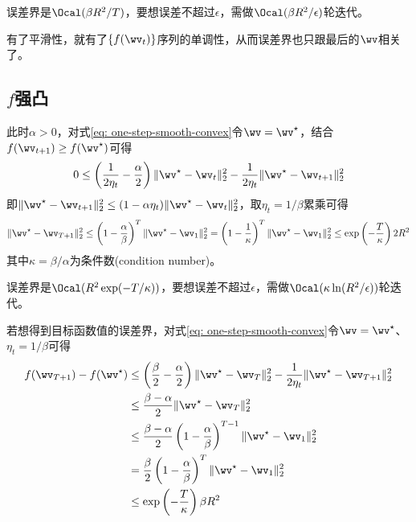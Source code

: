 \documentclass{ctexart}
\begin{document}
\begin{remark}
    误差界是$\Ocal(\beta R^2/T)$，要想误差不超过$\epsilon$，需做$\Ocal(\beta R^2/\epsilon)$轮迭代。
\end{remark}

\begin{remark}
    有了平滑性，就有了$\{ f(\wv_t) \}$序列的单调性，从而误差界也只跟最后的$\wv$相关了。
\end{remark}

\subsection{$f$强凸}

此时$\alpha > 0$，对式\eqref{eq: one-step-smooth-convex}令$\wv = \wv^\star$，结合$f(\wv_{t+1}) \ge f(\wv^\star)$可得
\begin{align*}
    0 \le \left( \frac{1}{2\eta_t} - \frac{\alpha}{2} \right) \| \wv^\star - \wv_t \|_2^2 - \frac{1}{2\eta_t} \| \wv^\star - \wv_{t+1} \|_2^2
\end{align*}
即$\| \wv^\star - \wv_{t+1} \|_2^2 \le (1 - \alpha \eta_t) \| \wv^\star - \wv_t \|_2^2$，取$\eta_t = 1/ \beta$累乘可得
\begin{align*}
    \| \wv^\star - \wv_{T+1} \|_2^2 \le \left(1 - \frac{\alpha}{\beta} \right)^T \| \wv^\star - \wv_1 \|_2^2 = \left( 1 - \frac{1}{\kappa} \right)^T \| \wv^\star - \wv_1 \|_2^2 \le \exp \left( -\frac{T}{\kappa} \right) 2 R^2
\end{align*}
其中$\kappa = \beta/\alpha$为条件数(condition number)。

\begin{remark}
    误差界是$\Ocal(R^2 \exp(-T/\kappa))$，要想误差不超过$\epsilon$，需做$\Ocal(\kappa \ln (R^2/\epsilon))$轮迭代。
\end{remark}

若想得到目标函数值的误差界，对式\eqref{eq: one-step-smooth-convex}令$\wv = \wv^\star$、$\eta_t = 1 / \beta$可得
\begin{align*}
    f(\wv_{T+1}) - f(\wv^\star)
     & \le \left( \frac{\beta}{2} - \frac{\alpha}{2} \right) \| \wv^\star - \wv_T \|_2^2 - \frac{1}{2\eta_t} \| \wv^\star - \wv_{T+1} \|_2^2 \\
     & \le \frac{\beta - \alpha}{2} \| \wv^\star - \wv_T \|_2^2                                                                              \\
     & \le \frac{\beta - \alpha}{2} \left( 1 - \frac{\alpha}{\beta} \right)^{T-1} \| \wv^\star - \wv_1 \|_2^2                                \\
     & = \frac{\beta}{2} \left( 1 - \frac{\alpha}{\beta} \right)^T \| \wv^\star - \wv_1 \|_2^2                                               \\
     & \le \exp \left( -\frac{T}{\kappa} \right) \beta R^2
\end{align*}
\end{document}
